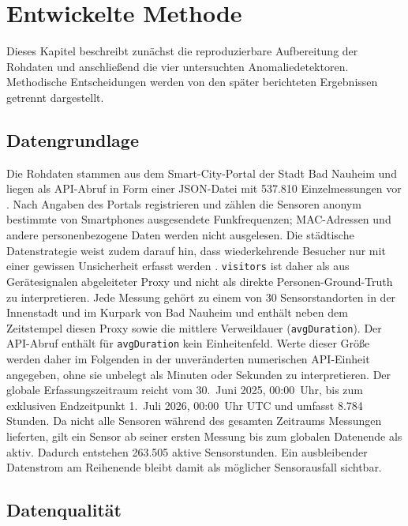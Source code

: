 \chapter{Entwickelte Methode}
\label{ch:EntwickelteMethode}

Dieses Kapitel beschreibt zunächst die reproduzierbare Aufbereitung der
Rohdaten und anschließend die vier untersuchten Anomaliedetektoren.
Methodische Entscheidungen werden von den später berichteten Ergebnissen
getrennt dargestellt.

\section{Datengrundlage}
\label{sec:Methode_Datengrundlage}

Die Rohdaten stammen aus dem Smart-City-Portal der Stadt Bad Nauheim und
liegen als API-Abruf in Form einer JSON-Datei mit 537.810 Einzelmessungen vor
\cite{badnauheim_pedestrian_2026}. Nach Angaben des Portals registrieren und
zählen die Sensoren anonym bestimmte von Smartphones ausgesendete
Funkfrequenzen; MAC-Adressen und andere personenbezogene Daten werden nicht
ausgelesen. Die städtische Datenstrategie weist zudem darauf hin, dass
wiederkehrende Besucher nur mit einer gewissen Unsicherheit erfasst werden
\cite{badnauheim_datenstrategie_2024}. \texttt{visitors} ist daher als aus
Gerätesignalen abgeleiteter Proxy und nicht als direkte Personen-Ground-Truth
zu interpretieren. Jede Messung gehört zu einem von 30 Sensorstandorten in der
Innenstadt und im Kurpark von Bad Nauheim und enthält neben dem Zeitstempel
diesen Proxy sowie die mittlere Verweildauer (\texttt{avgDuration}). Der
API-Abruf enthält für \texttt{avgDuration} kein Einheitenfeld. Werte dieser
Größe werden daher im Folgenden in der unveränderten numerischen API-Einheit
angegeben, ohne sie unbelegt als Minuten oder Sekunden zu interpretieren. Der globale
Erfassungszeitraum reicht vom 30.~Juni
2025, 00:00~Uhr, bis zum exklusiven Endzeitpunkt 1.~Juli 2026, 00:00~Uhr UTC
und umfasst 8.784 Stunden. Da nicht alle Sensoren während des gesamten
Zeitraums Messungen lieferten, gilt ein Sensor ab seiner ersten Messung bis zum
globalen Datenende als aktiv. Dadurch entstehen 263.505 aktive Sensorstunden.
Ein ausbleibender Datenstrom am Reihenende bleibt damit als möglicher
Sensorausfall sichtbar.

\section{Datenqualität}
\label{sec:Methode_Datenqualitaet}

